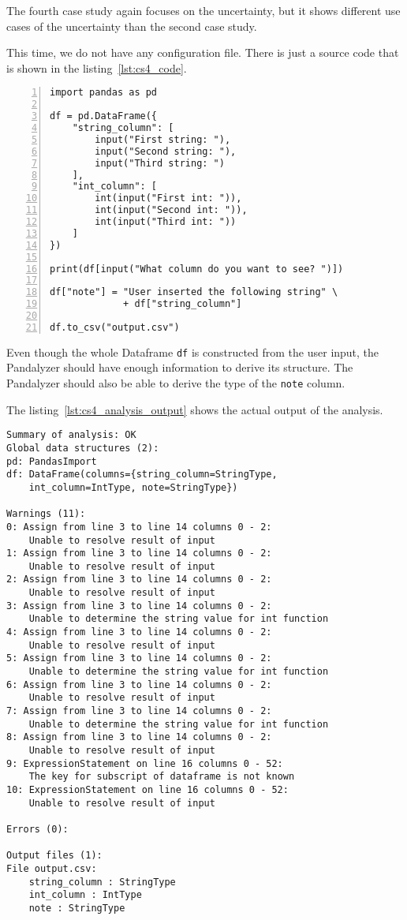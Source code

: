 The fourth case study again focuses on the uncertainty, but it shows different use cases of the uncertainty than the
second case study.

This time, we do not have any configuration file.
There is just a source code that is shown in the listing~\ref{lst:cs4_code}.

\begin{lstlisting}[caption=Code for the fourth case study in Pandas, label={lst:cs4_code}, captionpos=b, numbers=left]
import pandas as pd

df = pd.DataFrame({
    "string_column": [
        input("First string: "),
        input("Second string: "),
        input("Third string: ")
    ],
    "int_column": [
        int(input("First int: ")),
        int(input("Second int: ")),
        int(input("Third int: "))
    ]
})

print(df[input("What column do you want to see? ")])

df["note"] = "User inserted the following string" \
             + df["string_column"]

df.to_csv("output.csv")
\end{lstlisting}

Even though the whole Dataframe \verb|df| is constructed from the user input, the Pandalyzer should have enough
information to derive its structure.
The Pandalyzer should also be able to derive the type of the \verb|note| column.

The listing~\ref{lst:cs4_analysis_output} shows the actual output of the analysis.

\begin{lstlisting}[caption=Analysis output of the fourth case study, label={lst:cs4_analysis_output}, captionpos=b]
Summary of analysis: OK
Global data structures (2):
pd: PandasImport
df: DataFrame(columns={string_column=StringType,
    int_column=IntType, note=StringType})

Warnings (11):
0: Assign from line 3 to line 14 columns 0 - 2:
    Unable to resolve result of input
1: Assign from line 3 to line 14 columns 0 - 2:
    Unable to resolve result of input
2: Assign from line 3 to line 14 columns 0 - 2:
    Unable to resolve result of input
3: Assign from line 3 to line 14 columns 0 - 2:
    Unable to determine the string value for int function
4: Assign from line 3 to line 14 columns 0 - 2:
    Unable to resolve result of input
5: Assign from line 3 to line 14 columns 0 - 2:
    Unable to determine the string value for int function
6: Assign from line 3 to line 14 columns 0 - 2:
    Unable to resolve result of input
7: Assign from line 3 to line 14 columns 0 - 2:
    Unable to determine the string value for int function
8: Assign from line 3 to line 14 columns 0 - 2:
    Unable to resolve result of input
9: ExpressionStatement on line 16 columns 0 - 52:
    The key for subscript of dataframe is not known
10: ExpressionStatement on line 16 columns 0 - 52:
    Unable to resolve result of input

Errors (0):

Output files (1):
File output.csv:
    string_column : StringType
    int_column : IntType
    note : StringType
\end{lstlisting}

